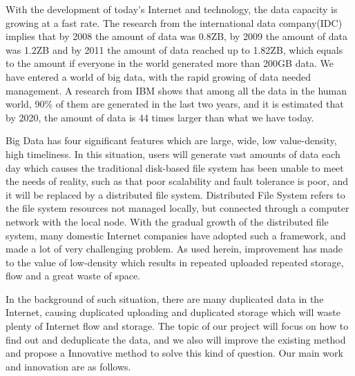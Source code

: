 
\begin{englishabstract}

    With the development of today's Internet and technology, the data capacity is growing at a fast rate. The research from the international data company(IDC) implies that by 2008 the amount of data was 0.8ZB, by 2009 the amount of data was 1.2ZB and by 2011 the amount of data reached up to 1.82ZB, which equals to the amount if everyone in the world generated more than 200GB data. We have entered a world of big data, with the rapid growing of data needed management. A research from IBM shows that among all the data in the human world, 90\% of them are generated in the last two years, and it is estimated that by 2020, the amount of data is 44 times larger than what we have today.

    Big Data has four significant features which are large, wide, low value-density, high timeliness. In this situation, users will generate vast amounts of data each day which causes the traditional disk-based file system has been unable to meet the needs of reality, such as that poor scalability and fault tolerance is poor, and it will be replaced by a distributed file system. Distributed File System refers to the file system resources not managed locally, but connected through a computer network with the local node. With the gradual growth of the distributed file system, many domestic Internet companies have adopted such a framework, and made a lot of very challenging problem. As used herein, improvement has made to the value of low-density which results in repeated uploaded repeated storage, flow and a great waste of space.

    In the background of such situation, there are many duplicated data in the Internet, causing duplicated uploading and duplicated storage which will waste plenty of Internet flow and storage. The topic of our project will focus on how to find out and deduplicate the data, and we also will improve the existing method and propose a Innovative method to solve this kind of question. Our main work and innovation are as follows.


\end{englishabstract}
